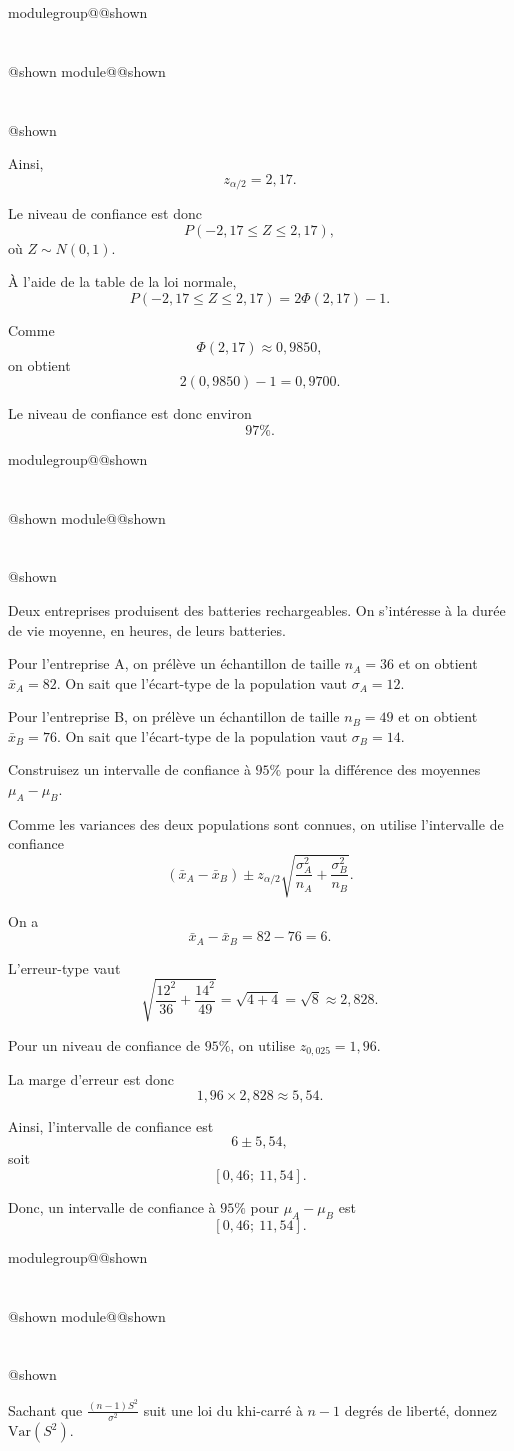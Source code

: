 \documentclass{Evaluation}
\makeatletter
\newcommand{\currentmodulekey}{}
\newcommand{\currentmoduletitle}{}
\newcommand{\currentgroupkey}{}
\newcommand{\currentgrouptitle}{}
\newcommand{\showmoduleifneeded}{%
  \ifx\currentgroupkey\empty\else
    \expandafter\ifx\csname modulegroup@\currentgroupkey @shown\endcsname\relax
      \section*{\currentgrouptitle}%
      \expandafter\gdef\csname modulegroup@\currentgroupkey @shown\endcsname{1}%
    \fi
  \fi
  \expandafter\ifx\csname module@\currentmodulekey @shown\endcsname\relax
    \section*{\currentmoduletitle}%
    \expandafter\gdef\csname module@\currentmodulekey @shown\endcsname{1}%
  \fi
}
\newenvironment{A22}{\showmoduleifneeded}{}
\newenvironment{H26r}{\showmoduleifneeded}{}
\makeatother
\begin{document}
\begin{questions}
\begin{H26r}
\begin{solution}
Ainsi,
\[
z_{\alpha/2}=2{,}17.
\]

Le niveau de confiance est donc
\[
P(-2{,}17\leq Z\leq 2{,}17),
\]
où \(Z\sim N(0,1)\).

À l'aide de la table de la loi normale,
\[
P(-2{,}17\leq Z\leq 2{,}17)
=
2\Phi(2{,}17)-1.
\]

Comme
\[
\Phi(2{,}17)\approx 0{,}9850,
\]
on obtient
\[
2(0{,}9850)-1=0{,}9700.
\]

Le niveau de confiance est donc environ
\[
\boxed{97\%.}
\]
\end{solution}
\end{H26r}

\begin{H26r}
\question {} %
Deux entreprises produisent des batteries rechargeables. On s'intéresse à la durée de vie moyenne, en heures, de leurs batteries.

Pour l'entreprise A, on prélève un échantillon de taille \(n_A=36\) et on obtient \(\bar x_A=82\). On sait que l'écart-type de la population vaut \(\sigma_A=12\).

Pour l'entreprise B, on prélève un échantillon de taille \(n_B=49\) et on obtient \(\bar x_B=76\). On sait que l'écart-type de la population vaut \(\sigma_B=14\).

Construisez un intervalle de confiance à \(95\%\) pour la différence des moyennes \(\mu_A-\mu_B\).

\begin{solution}
Comme les variances des deux populations sont connues, on utilise l'intervalle de confiance
\[
(\bar x_A-\bar x_B)\pm z_{\alpha/2}\sqrt{\frac{\sigma_A^2}{n_A}+\frac{\sigma_B^2}{n_B}}.
\]

On a
\[
\bar x_A-\bar x_B=82-76=6.
\]

L'erreur-type vaut
\[
\sqrt{\frac{12^2}{36}+\frac{14^2}{49}}
=\sqrt{4+4}
=\sqrt{8}
\approx 2{,}828.
\]

Pour un niveau de confiance de \(95\%\), on utilise \(z_{0{,}025}=1{,}96\).

La marge d'erreur est donc
\[
1{,}96\times 2{,}828\approx 5{,}54.
\]

Ainsi, l'intervalle de confiance est
\[
6\pm 5{,}54,
\]
soit
\[
[0{,}46;\ 11{,}54].
\]

Donc, un intervalle de confiance à \(95\%\) pour \(\mu_A-\mu_B\) est
\[
\boxed{[0{,}46;\ 11{,}54]}.
\]
\end{solution}
\end{H26r}

\begin{A22}
\question {} %
Sachant que $\displaystyle \frac{(n-1)S^2}{\sigma^2}$ suit une loi du khi-carré à $n-1$ degrés de liberté, donnez $\text{Var}(S^2)$.


\end{A22}
\end{questions}
\end{document}
